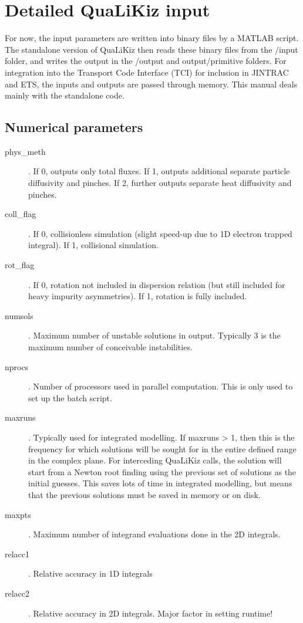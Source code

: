 \documentclass{article}
\begin{document}
\section{Detailed QuaLiKiz input}
For now, the input parameters are written into binary files by a MATLAB script. The standalone version of QuaLiKiz then reads these binary files from the /input folder, and writes the output in the /output and output/primitive folders. For integration into the Transport Code Interface (TCI) for inclusion in JINTRAC and ETS, the inputs and outputs are passed through memory. This manual deals mainly with the standalone code.
\subsection{Numerical parameters}
\begin{description}
\item[phys\_meth]. If 0, outputs only total fluxes. If 1, outputs additional separate particle diffusivity and pinches. If 2, further outputs separate heat diffusivity and pinches.
\item[coll\_flag]. If 0, collisionless simulation (slight speed-up due to 1D electron trapped integral). If 1, collisional simulation.
\item[rot\_flag]. If 0, rotation not included in dispersion relation (but still included for heavy impurity asymmetries). If 1, rotation is fully included. 
\item[numsols]. Maximum number of unstable solutions in output. Typically 3 is the maximum number of conceivable instabilities. 
\item[nprocs]. Number of processors used in parallel computation. This is only used to set up the batch script.
\item[maxruns]. Typically used for integrated modelling. If maxruns > 1, then this is the frequency for which solutions will be sought for in the entire defined range in the complex plane. For interceding QuaLiKiz calls, the solution will start from a Newton root finding using the previous set of solutions as the initial guesses. This saves lots of time in integrated modelling, but means that the previous solutions must be saved in memory or on disk.
\item[maxpts]. Maximum number of integrand evaluations done in the 2D integrals.
\item[relacc1]. Relative accuracy in 1D integrals
\item[relacc2]. Relative accuracy in 2D integrals. Major factor in setting runtime!

\end{description}
\end{document}
